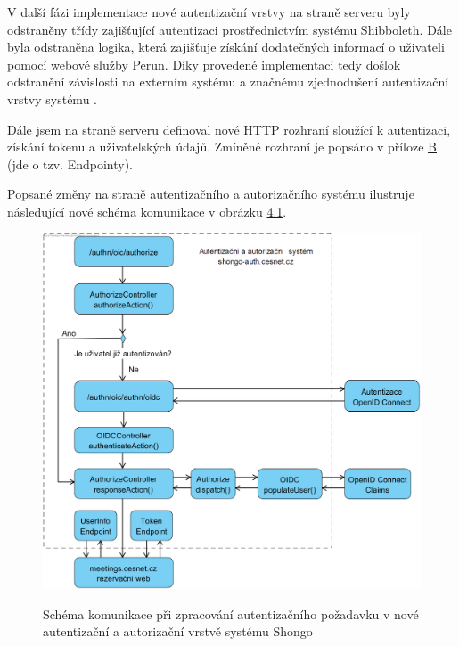\documentclass[
  printed, %
  twoside, %
  table,   %
  nolof,     %
  nolot,     %
]{fithesis3}
\begin{document}
\par
V další fázi implementace nové autentizační vrstvy na straně serveru  byly odstraněny třídy zajišťující autentizaci prostřednictvím systému Shibboleth. Dále byla odstraněna logika, která zajišťuje získání dodatečných informací o uživateli pomocí webové služby Perun. Díky provedené implementaci tedy došlo\break k odstranění závislosti na externím systému a značnému zjednodušení autentizační vrstvy systému .

\par
Dále jsem na straně serveru  definoval nové HTTP rozhraní sloužící k autentizaci, získání tokenu a uživatelských údajů. Zmíněné rozhraní je popsáno v příloze \hyperref[oidcEndpoints]{B} (jde o tzv. Endpointy).
\par 


Popsané změny na straně autentizačního a autorizačního systému  ilustruje následující nové schéma komunikace v obrázku \hyperref[fig:shongoAuthnProcessNew]{4.1}.

\begin{figure}[H]
\caption{Schéma komunikace při zpracování autentizačního požadavku v nové autentizační a autorizační vrstvě systému Shongo}
\vspace{5mm}
\centering
\includegraphics[width=12.8cm]{pics/shongo-auth-layer-new} 
\label{fig:shongoAuthnProcessNew}
\end{figure}
\end{document}
